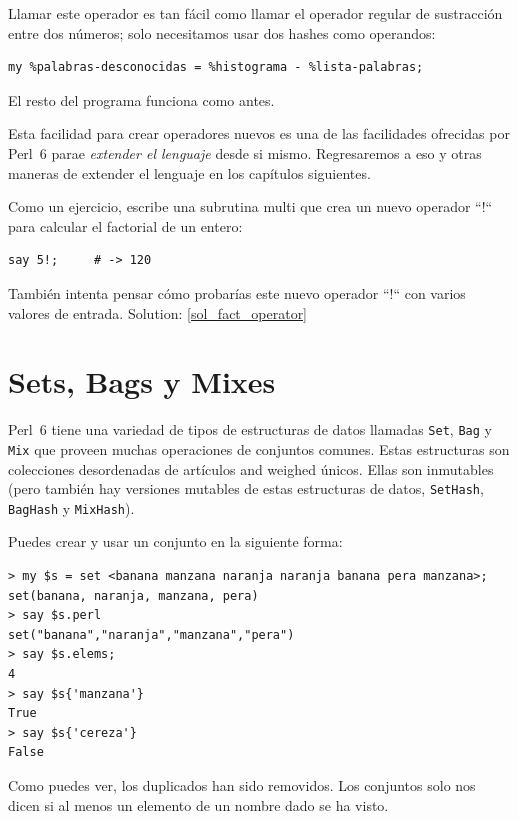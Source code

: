 Llamar este operador es tan fácil como llamar el operador regular de 
sustracción entre dos números; solo necesitamos usar dos hashes como
operandos:

\begin{verbatim}
my %palabras-desconocidas = %histograma - %lista-palabras;
\end{verbatim}

El resto del programa funciona como antes.

Esta facilidad para crear operadores nuevos es una de las facilidades
ofrecidas por Perl~6 parae \emph{extender el lenguaje} desde si mismo.
Regresaremos a eso y otras maneras de extender el lenguaje en los
capítulos siguientes.

\label{fact_operator}
Como un ejercicio, escribe una subrutina multi que crea un nuevo operador
``!`` para calcular el factorial de un entero:

\begin{verbatim}
say 5!;     # -> 120
\end{verbatim}
%
También intenta pensar cómo probarías este nuevo operador ``!``
con varios valores de entrada.
Solution: \ref{sol_fact_operator}


\section{Sets, Bags y Mixes}
\label{sets_and_bags}


Perl~6 tiene una variedad de tipos de estructuras de datos llamadas
{\tt Set}, {\tt Bag} y {\tt Mix} que proveen muchas operaciones de
conjuntos comunes. Estas estructuras son colecciones desordenadas de
artículos {and weighed} únicos. Ellas son inmutables (pero también hay
versiones mutables de estas estructuras de datos, {\tt SetHash}, {\tt BagHash} 
y {\tt MixHash}).

Puedes crear y usar un conjunto en la siguiente forma:

\begin{verbatim}
> my $s = set <banana manzana naranja naranja banana pera manzana>;
set(banana, naranja, manzana, pera)
> say $s.perl
set("banana","naranja","manzana","pera")
> say $s.elems;
4
> say $s{'manzana'}
True
> say $s{'cereza'}
False
\end{verbatim}
%
Como puedes ver, los duplicados han sido removidos. Los conjuntos
solo nos dicen si al menos un elemento de un nombre dado se ha visto. 

